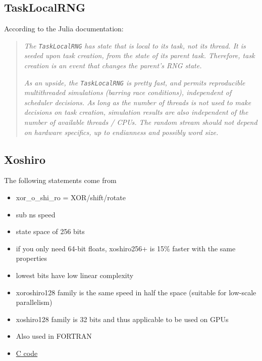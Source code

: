 \documentclass{article}
\begin{document}
        \subsection*{TaskLocalRNG}

        According to the Julia documentation\cite*{Julia-2017}:

            \begin{quote}
                \textit{The \texttt{TaskLocalRNG} has state that is local to its task, not its thread. It is seeded upon task creation, from the state of its parent task. Therefore, task creation is an event that changes the parent's RNG state.}

                \textit{As an upside, the \texttt{TaskLocalRNG} is pretty fast, and permits reproducible multithreaded simulations (barring race conditions), independent of scheduler decisions. As long as the number of threads is not used to make decisions on task creation, simulation results are also independent of the number of available threads / CPUs. The random stream should not depend on hardware specifics, up to endianness and possibly word size.}
            \end{quote}

        \subsection*{Xoshiro}

            The following statements come from \cite*{xoroshiro}
            \begin{itemize}
                \item xor\_o\_shi\_ro = XOR/shift/rotate
                \item sub ns speed
                \item state space of 256 bits
                \item if you only need 64-bit floats, xoshiro256+ is 15\% faster with the same properties
                \item lowest bits have low linear complexity
                \item xoroshiro128 family is the same speed in half the space (suitable for low-scale parallelism)
                \item xoshiro128 family is 32 bits and thus applicable to be used on GPUs
                \item Also used in FORTRAN
                \item \href{https://prng.di.unimi.it/xoshiro256plusplus.c}{C code}
            \end{itemize}
\end{document}
